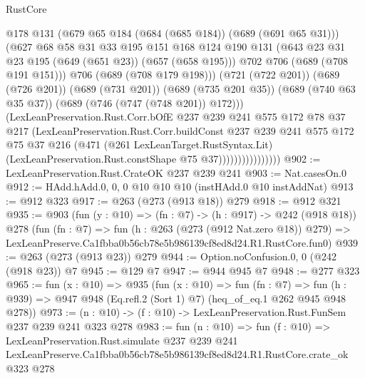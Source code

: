 \begin{lexlean}{RustCore}
\begin{coremodule}
                                @178
                                @131
                                (@679 @65 @184 (@684 (@685 @184)) (@689 (@691 @65 @31)))
                                (@627
                                  @68
                                  @58
                                  @31
                                  @33
                                  @195
                                  @151
                                  @168
                                  @124
                                  @190
                                  @131
                                  (@643 @23 @31 @23 @195 (@649 (@651 @23)) (@657 (@658 @195)))
                                  @702
                                  @706
                                  (@689 (@708 @191 @151)))
                                @706
                                (@689 (@708 @179 @198)))
                              (@721 (@722 @201))
                              (@689 (@726 @201))
                              (@689 (@731 @201))
                              (@689 (@735 @201 @35))
                              (@689 (@740 @63 @35 @37))
                              (@689 (@746 (@747 (@748 @201)) @172)))
                            (LexLeanPreservation.Rust.Corr.bOfE
                              @237
                              @239
                              @241
                              @575
                              @172
                              @78
                              @37
                              @217
                              (LexLeanPreservation.Rust.Corr.buildConst
                                @237
                                @239
                                @241
                                @575
                                @172
                                @75
                                @37
                                @216
                                (@471
                                  (@261 LexLeanTarget.RustSyntax.Lit)
                                  (LexLeanPreservation.Rust.constShape @75 @37))))))))))))))))
@902 := LexLeanPreservation.Rust.CrateOK @237 @239 @241
@903 := Nat.casesOn.{0}
@912 := HAdd.hAdd.{0, 0, 0} @10 @10 @10 (instHAdd.{0} @10 instAddNat)
@913 := @912 @323
@917 := @263 (@273 (@913 @18)) @279
@918 := @912 @321
@935 := @903
    (fun (y : @10) => (fn : @7) -> (h : @917) -> @242 (@918 @18))
    @278
    (fun (fn : @7) =>
    fun (h : @263 (@273 (@912 Nat.zero @18)) @279) =>
    LexLeanPreserve.Ca1fbba0b56cb78e5b986139cf8ed8d24.R1.RustCore.fun0)
@939 := @263 (@273 (@913 @23)) @279
@944 := Option.noConfusion.{0, 0} (@242 (@918 @23)) @7
@945 := @129 @7
@947 := @944 @945 @7
@948 := @277 @323
@965 := fun (x : @10) =>
  @935
    (fun (x : @10) =>
    fun (fn : @7) =>
    fun (h : @939) => @947 @948 (Eq.refl.{2} (Sort 1) @7) (heq_of_eq.{1} @262 @945 @948 @278))
@973 := (n : @10) -> (f : @10) -> LexLeanPreservation.Rust.FunSem @237 @239 @241 @323 @278
@983 := fun (n : @10) =>
  fun (f : @10) =>
  LexLeanPreservation.Rust.simulate
    @237
    @239
    @241
    LexLeanPreserve.Ca1fbba0b56cb78e5b986139cf8ed8d24.R1.RustCore.crate_ok
    @323
    @278
\end{coremodule}
\end{lexlean}
